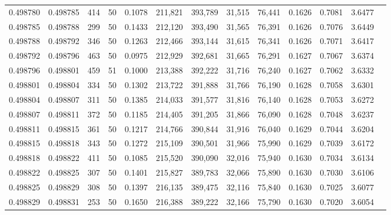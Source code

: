 \begin{tabular}{rrrrrrrrrrrrr}
0.498780 & 0.498785 & 414 &  50 &                                     0.1078 & 211,821 & 393,789 &  31,515 &  76,441 & 0.1626 & 0.7081 & 3.6477 \\
0.498785 & 0.498788 & 299 &  50 &                                     0.1433 & 212,120 & 393,490 &  31,565 &  76,391 & 0.1626 & 0.7076 & 3.6449 \\
0.498788 & 0.498792 & 346 &  50 &                                     0.1263 & 212,466 & 393,144 &  31,615 &  76,341 & 0.1626 & 0.7071 & 3.6417 \\
0.498792 & 0.498796 & 463 &  50 &                                     0.0975 & 212,929 & 392,681 &  31,665 &  76,291 & 0.1627 & 0.7067 & 3.6374 \\
0.498796 & 0.498801 & 459 &  51 &                                     0.1000 & 213,388 & 392,222 &  31,716 &  76,240 & 0.1627 & 0.7062 & 3.6332 \\
0.498801 & 0.498804 & 334 &  50 &                                     0.1302 & 213,722 & 391,888 &  31,766 &  76,190 & 0.1628 & 0.7058 & 3.6301 \\
0.498804 & 0.498807 & 311 &  50 &                                     0.1385 & 214,033 & 391,577 &  31,816 &  76,140 & 0.1628 & 0.7053 & 3.6272 \\
0.498807 & 0.498811 & 372 &  50 &                                     0.1185 & 214,405 & 391,205 &  31,866 &  76,090 & 0.1628 & 0.7048 & 3.6237 \\
0.498811 & 0.498815 & 361 &  50 &                                     0.1217 & 214,766 & 390,844 &  31,916 &  76,040 & 0.1629 & 0.7044 & 3.6204 \\
0.498815 & 0.498818 & 343 &  50 &                                     0.1272 & 215,109 & 390,501 &  31,966 &  75,990 & 0.1629 & 0.7039 & 3.6172 \\
0.498818 & 0.498822 & 411 &  50 &                                     0.1085 & 215,520 & 390,090 &  32,016 &  75,940 & 0.1630 & 0.7034 & 3.6134 \\
0.498822 & 0.498825 & 307 &  50 &                                     0.1401 & 215,827 & 389,783 &  32,066 &  75,890 & 0.1630 & 0.7030 & 3.6106 \\
0.498825 & 0.498829 & 308 &  50 &                                     0.1397 & 216,135 & 389,475 &  32,116 &  75,840 & 0.1630 & 0.7025 & 3.6077 \\
0.498829 & 0.498831 & 253 &  50 &                                     0.1650 & 216,388 & 389,222 &  32,166 &  75,790 & 0.1630 & 0.7020 & 3.6054 \\

\end{tabular}
